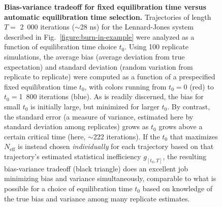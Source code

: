 \documentclass[aps,pre,twocolumn,nofootinbib,superscriptaddress,linenumbers,11point]{revtex4-1}
\begin{document}
\begin{figure}[tbp]
\caption{\label{figure:bias-variance} {\bf Bias-variance tradeoff for fixed equilibration time versus automatic equilibration time selection.} 
Trajectories of length $T = $ 2~000 iterations ($\sim$28 ns) for the Lennard-Jones system described in Fig.~\ref{figure:burn-in-example} were analyzed as a function of equilibration time choice $t_0$.
Using 100 replicate simulations, the average bias (average deviation from true expectation) and standard deviation (random variation from replicate to replicate) were computed as a function of a prespecified fixed equilibration time $t_0$, with colors running from $t_0 = 0$ (red) to $t_0 =$1~800 iterations (blue).
As is readily discerned, the bias for small $t_0$ is initially large, but minimized for larger $t_0$.
By contrast, the standard error (a measure of variance, estimated here by standard deviation among replicates) grows as $t_0$ grows above a certain critical time (here, $\sim$222 iterations).
If the $t_0$ that maximizes $N_\mathrm{eff}$ is instead chosen \emph{individually} for each trajectory based on that trajectory's estimated statistical inefficiency $g_{[t_0,T]}$, the resulting bias-variance tradeoff (black triangle) does an excellent job minimizing bias and variance simultaneously, comparable to what is possible for a choice of equilibration time $t_0$ based on knowledge of the true bias and variance among many replicate estimates.
}
\end{figure}
\end{document}
